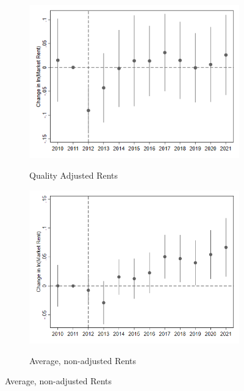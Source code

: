 \documentclass[12pt]{article}
\begin{document}
{{{{{{{{{\begin{figure}[h!]
\begin{center}
\caption{High Surge Rent Impacts with Census Tract Fixed Effects}
\label{fig:tractfe}
\begin{subfigure}[b]{0.6\textwidth}
\caption{Quality Adjusted Rents}
\includegraphics[scale = 0.6]{Robustness/R7 High Surge Rent Impacts_8_1_tract.png}
\label{fig:tractadj}
\end{subfigure}
\hfill
\begin{subfigure}[b]{0.6\textwidth}
\caption{Average, non-adjusted Rents}
\includegraphics[scale = 0.45]{Robustness/R7 High Surge Rent Impacts_8_1_tract_noage.png}
\label{fig:tractnoage}
\end{subfigure}
\hfill
\end{center}
\end{figure}


}}}}}}}}}
\end{document}

